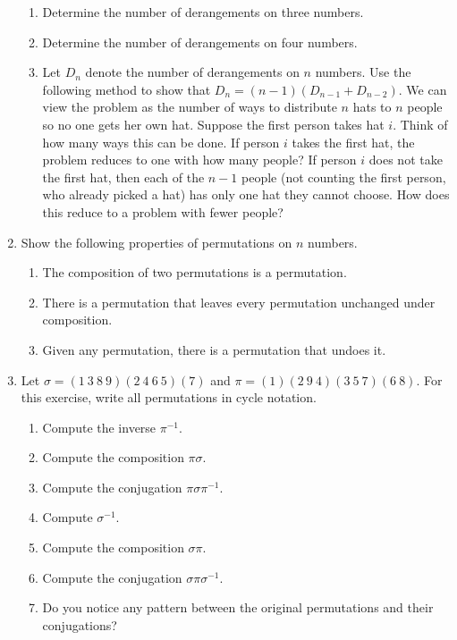 \documentclass{book}
\theoremstyle{plain}
\theoremstyle{definition}
\newif\ifprintsolutions
\newcommand{\solution}[1]{\ifprintsolutions \begin{sloppypar}{\it #1}\end{sloppypar} \fi} %
\begin{document}
\begin{enumerate}
\begin{enumerate}
\item Determine the number of derangements on three numbers. \solution{There are two such derangements.}
\item Determine the number of derangements on four numbers. \solution{There are nine such derangements.}
\item Let $D_n$ denote the number of derangements on $n$ numbers. Use the following method to show that $D_n = (n-1)(D_{n-1} + D_{n-2})$. We can view the problem as the number of ways to distribute $n$ hats to $n$ people so no one gets her own hat. Suppose the first person takes hat $i$. Think of how many ways this can be done. If person $i$ takes the first hat, the problem reduces to one with how many people? If person $i$ does not take the first hat, then each of the $n-1$ people (not counting the first person, who already picked a hat) has only one hat they cannot choose. How does this reduce to a problem with fewer people?
\end{enumerate}
\item Show the following properties of permutations on $n$ numbers.
\begin{enumerate}
\item The composition of two permutations is a permutation.
\item There is a permutation that leaves every permutation unchanged under composition.
\item Given any permutation, there is a permutation that undoes it.
\end{enumerate}
\item Let $\sigma = (1\ 3\ 8\ 9)(2\ 4\ 6\ 5)(7)$ and $\pi = (1)(2\ 9\ 4)(3\ 5\ 7)(6\ 8)$. For this exercise, write all permutations in cycle notation.
\begin{enumerate}
\item Compute the inverse $\pi^{-1}$. \solution{$\text{(1)(2 4 9)(3 7 5)(6 8)}$}
\item Compute the composition $\pi\sigma$. \solution{$\text{(1 5 9)(2)(3 6 7)(4 8)}$}
\item Compute the conjugation $\pi\sigma\pi^{-1}$. \solution{$\text{(1 5 6 4)(2 8 7 9)(3)}$}
\item Compute $\sigma^{-1}$. \solution{$\text{(1 9 8 3)(2 5 6 4)(7)}$}
\item Compute the composition $\sigma\pi$. \solution{$\text{(1 3 2)(4)(5 7 8)(6 9)}$}
\item Compute the conjugation $\sigma\pi\sigma^{-1}$. \solution{$\text{(1 6 4)(2 7 8)(3)(5 9)}$}
\item Do you notice any pattern between the original permutations and their conjugations? \solution{The cycle structure of each permutation matches that of its conjugation.}

\end{enumerate}
\end{enumerate}
\end{document}
